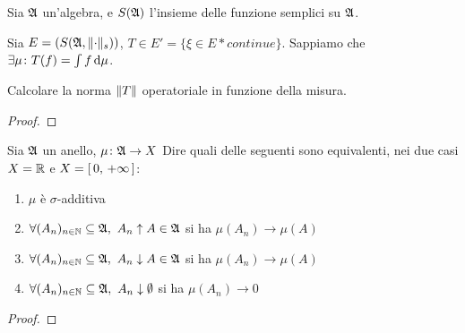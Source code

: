 \documentclass[../EserciziIstituzioniAnalisi.tex]{subfiles}
\begin{document}
\begin{exercise}[2016-10-14]
  Sia $\mathfrak A$ un'algebra, e $S(\mathfrak A)$ l'insieme delle funzione semplici su $\mathfrak A$.
  
  Sia $E=\left(S(\mathfrak A,\lVert\cdot\rVert_s)\right)$, $T\in E'=\{\xi \in E* continue\}$.
  Sappiamo che $\exists \mu\colon T(f)=\int f \,\mathrm d \mu$.
  
  Calcolare la norma $\lVert T\rVert$ operatoriale in funzione della misura.
\end{exercise}
\begin{proof}
  
\end{proof}
\begin{exercise}[2016-10-14]
  Sia $\mathfrak A$ un anello, $\mu\colon\mathfrak A\to X$
  Dire quali delle seguenti sono equivalenti, nei due casi $X=\mathbb R$ e $X=\left[\,0,\,+\infty\,\right]$:
  \begin{enumerate}
    \item $\mu$ è $\sigma$-additiva
    \item $\forall (A_n)_{n\in\N}\subseteq \gA,\ A_n \uparrow A\in \gA$ si ha $\mu(A_n)\rightarrow \mu(A)$
    \item $\forall (A_n)_{n\in\N}\subseteq \gA,\ A_n \downarrow A\in \gA$ si ha $\mu(A_n)\rightarrow \mu(A)$ 
    \item $\forall (A_n)_{n\in\N}\subseteq \gA,\ A_n \downarrow \emptyset$ si ha $\mu(A_n)\rightarrow 0$
  \end{enumerate}
\end{exercise}
\begin{proof}
  
\end{proof}
\end{document}
